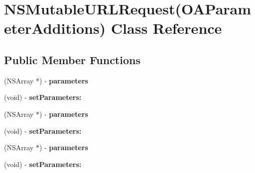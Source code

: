 \hypertarget{interface_n_s_mutable_u_r_l_request_07_o_a_parameter_additions_08}{
\section{\-N\-S\-Mutable\-U\-R\-L\-Request(\-O\-A\-Parameter\-Additions) \-Class \-Reference}
\label{interface_n_s_mutable_u_r_l_request_07_o_a_parameter_additions_08}
}
\subsection*{\-Public \-Member \-Functions}
\begin{DoxyCompactItemize}
\item 
\hypertarget{interface_n_s_mutable_u_r_l_request_07_o_a_parameter_additions_08_aa7d50b5b502c137ebf70f93e98a0e64d}{
(\-N\-S\-Array $\ast$) -\/ {\bfseries parameters}}
\label{interface_n_s_mutable_u_r_l_request_07_o_a_parameter_additions_08_aa7d50b5b502c137ebf70f93e98a0e64d}

\item 
\hypertarget{interface_n_s_mutable_u_r_l_request_07_o_a_parameter_additions_08_ac463906bcbcbc5427d1f766ddd08a913}{
(void) -\/ {\bfseries set\-Parameters\-:}}
\label{interface_n_s_mutable_u_r_l_request_07_o_a_parameter_additions_08_ac463906bcbcbc5427d1f766ddd08a913}

\item 
\hypertarget{interface_n_s_mutable_u_r_l_request_07_o_a_parameter_additions_08_aa7d50b5b502c137ebf70f93e98a0e64d}{
(\-N\-S\-Array $\ast$) -\/ {\bfseries parameters}}
\label{interface_n_s_mutable_u_r_l_request_07_o_a_parameter_additions_08_aa7d50b5b502c137ebf70f93e98a0e64d}

\item 
\hypertarget{interface_n_s_mutable_u_r_l_request_07_o_a_parameter_additions_08_ac463906bcbcbc5427d1f766ddd08a913}{
(void) -\/ {\bfseries set\-Parameters\-:}}
\label{interface_n_s_mutable_u_r_l_request_07_o_a_parameter_additions_08_ac463906bcbcbc5427d1f766ddd08a913}

\item 
\hypertarget{interface_n_s_mutable_u_r_l_request_07_o_a_parameter_additions_08_aa7d50b5b502c137ebf70f93e98a0e64d}{
(\-N\-S\-Array $\ast$) -\/ {\bfseries parameters}}
\label{interface_n_s_mutable_u_r_l_request_07_o_a_parameter_additions_08_aa7d50b5b502c137ebf70f93e98a0e64d}

\item 
\hypertarget{interface_n_s_mutable_u_r_l_request_07_o_a_parameter_additions_08_ac463906bcbcbc5427d1f766ddd08a913}{
(void) -\/ {\bfseries set\-Parameters\-:}}
\label{interface_n_s_mutable_u_r_l_request_07_o_a_parameter_additions_08_ac463906bcbcbc5427d1f766ddd08a913}

\end{DoxyCompactItemize}


